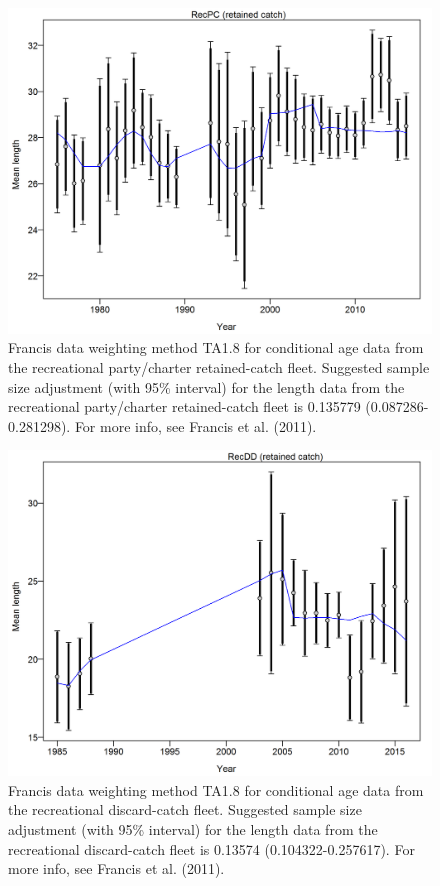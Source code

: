 \documentclass[12pt,]{article}
\begin{document}
\begin{figure}[htbp]
\centering
\includegraphics{r4ss/plots_mod1/comp_lenfit_data_weighting_TA1.8_RecPC.png}
\caption{Francis data weighting method TA1.8 for conditional age data
from the recreational party/charter retained-catch fleet. Suggested
sample size adjustment (with 95\% interval) for the length data from the
recreational party/charter retained-catch fleet is 0.135779
(0.087286-0.281298). For more info, see Francis et al. (2011).
\label{fig:comp_lenfit_data_weighting_TA1.8_RecPC}}
\end{figure}

\begin{figure}[htbp]
\centering
\includegraphics{r4ss/plots_mod1/comp_lenfit_data_weighting_TA1.8_RecDD.png}
\caption{Francis data weighting method TA1.8 for conditional age data
from the recreational discard-catch fleet. Suggested sample size
adjustment (with 95\% interval) for the length data from the
recreational discard-catch fleet is 0.13574 (0.104322-0.257617). For
more info, see Francis et al. (2011).
\label{fig:comp_lenfit_data_weighting_TA1.8_RecDD}}
\end{figure}
\end{document}
